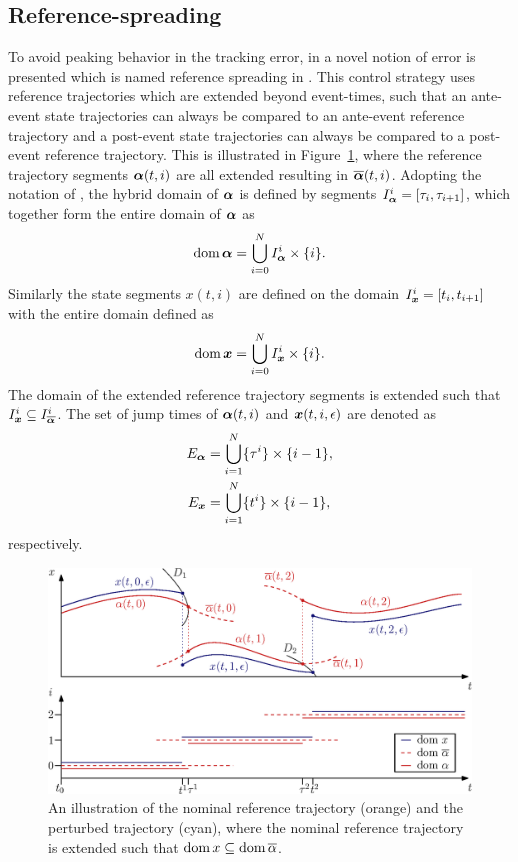 \documentclass[../DC2017114Bouma.tex]{subfiles}
\begin{document}
\subsection{Reference-spreading}
To avoid peaking behavior in the tracking error, in \cite{Saccon2014} a novel notion of error is presented which is named reference spreading in \cite{Rijnen2016}. This control strategy uses reference trajectories which are extended beyond event-times, such that an ante-event state trajectories can always be compared to an ante-event reference trajectory and a post-event state trajectories can always be compared to a post-event reference trajectory. This is illustrated in Figure~\ref{fig:3refspread}, where the reference trajectory segments $\boldsymbol{\alpha}(t,i)$ are all extended resulting in $\overline{\boldsymbol{\alpha}}(t,i)$. Adopting the notation of \cite{Goebel2009}, the hybrid domain of $\boldsymbol{\alpha}$ is defined by segments $I^i_{\boldsymbol{\alpha}} = [\tau_i,\tau_{i+1}]$, which together form the entire domain of $\boldsymbol{\alpha}$ as
\begin{align}
\operatorname{\textnormal{dom}}\boldsymbol{\alpha} = \bigcup^N_{i=0}I_{\boldsymbol{\alpha}}^i\times\{i\}.
\end{align}
%
Similarly the state segments $x(t,i)$ are defined on the domain $I^i_{\boldsymbol{x}} = [t_i,t_{i+1}]$ with the entire domain defined as
\begin{align}
\operatorname{\textnormal{dom}}{\boldsymbol{x}} = \bigcup^N_{i=0}I_{{\boldsymbol{x}}}^i\times\{i\}.
\end{align}
The domain of the extended reference trajectory segments is extended such that $I_{{\boldsymbol{x}}}^i\subseteq I_{\overline{\boldsymbol{\alpha}}}^i$. The set of jump times of $\boldsymbol{\alpha}(t,i)$ and ${\boldsymbol{x}}(t,i,\epsilon)$ are denoted as
\begin{align}
E_{\boldsymbol{\alpha}} &= \bigcup_{i=1}^N \{\tau^i\}\times\{i-1\},\\
E_{{\boldsymbol{x}}} &= \bigcup_{i=1}^N \{t^i\}\times\{i-1\},
\end{align}
respectively.
\begin{figure}[h]
\centering
\includegraphics[width=.9\textwidth]{refspreaddom.eps}\caption{An illustration of the nominal reference trajectory (orange) and the perturbed trajectory (cyan), where the nominal reference trajectory is extended such that $\operatorname{\textnormal{dom}} x\subseteq\operatorname{\textnormal{dom}} \overline{\alpha}$.} \label{fig:3refspread}
\end{figure}
\end{document}
